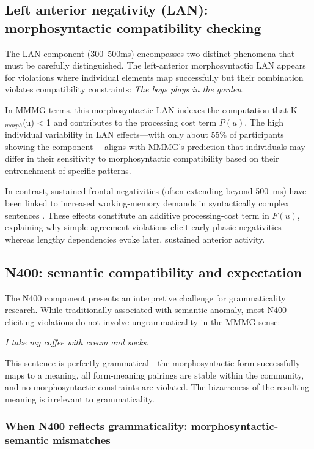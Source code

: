 \documentclass[12pt,letterpaper]{article}
\begin{document}
\subsection{Left anterior negativity (LAN): morphosyntactic compatibility checking}
The LAN component (300--500ms) encompasses two distinct phenomena that must be carefully distinguished. The left-anterior morphosyntactic LAN appears for violations where individual elements map successfully but their combination violates compatibility constraints:
\ea \label{ex:LAN}
\textit{The boys plays in the garden.}
\z

In MMMG terms, this morphosyntactic LAN indexes the computation that K$_{morph}$(u) < 1 and contributes to the processing cost term $P(u)$. The high individual variability in LAN effects---with only about 55\% of participants showing the component \autocite{Tanner2014}---aligns with MMMG's prediction that individuals may differ in their sensitivity to morphosyntactic compatibility based on their entrenchment of specific patterns.

In contrast, sustained frontal negativities (often extending beyond 500~ms) have been linked to increased working-memory demands in syntactically complex sentences \autocite{Fiebach2002,Coulson1998}. These effects constitute an additive processing-cost term in $F(u)$, explaining why simple agreement violations elicit early phasic negativities whereas lengthy dependencies evoke later, sustained anterior activity.

\subsection{N400: semantic compatibility and expectation}

The N400 component presents an interpretive challenge for grammaticality research. While traditionally associated with semantic anomaly, most N400-eliciting violations do not involve ungrammaticality in the MMMG sense:

\ea\label{ex:N400-grammatical}
\textit{I take my coffee with cream and socks.}
\z

This sentence is perfectly grammatical—the morphosyntactic form successfully maps to a meaning, all form-meaning pairings are stable within the community, and no morphosyntactic constraints are violated. The bizarreness of the resulting meaning is irrelevant to grammaticality.

\subsubsection{When N400 reflects grammaticality: morphosyntactic-semantic mismatches}
\end{document}
